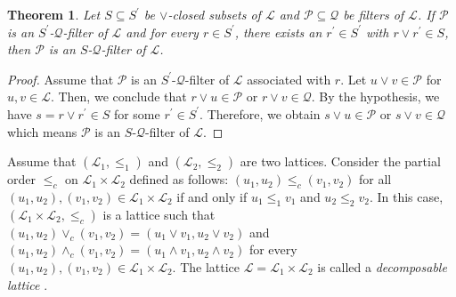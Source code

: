 \documentclass[preprint,review,10pt]{amsart}
\newtheorem{theorem}{Theorem}[section]
\theoremstyle{definition}
\theoremstyle{remark}
\numberwithin{equation}{section}
\begin{document}
\begin{theorem}
Let $S \subseteq S^{\prime}$ be   $\vee$-closed subsets of $\mathcal{L}$ and $\mathcal{P} \subseteq \mathcal{Q}$ be filters of $\mathcal{L}$. If  $\mathcal{P} $ is an  $S^{\prime}$-$\mathcal{Q}$-filter  of $\mathcal{L}$ and  for every $r \in S^{\prime}$, there exists an $r^{\prime} \in S^{\prime}$ with $r \vee r^{\prime} \in S$, then $\mathcal{P} $ is an $S$-$\mathcal{Q}$-filter of $\mathcal{L}$.
\end{theorem}
\begin{proof}
Assume that $\mathcal{P} $ is an  $S^{\prime}$-$\mathcal{Q}$-filter  of $\mathcal{L}$ associated with $r$. Let $u \vee v \in \mathcal{P} $ for $u,v \in  \mathcal{L}$. Then, we conclude that $r \vee u \in \mathcal{P} $ or $r \vee v \in \mathcal{Q} $. By the hypothesis, we have $s=r \vee r^{\prime} \in S$ for some $r^{\prime} \in S^{\prime}$. Therefore, we obtain $s \vee u \in \mathcal{P} $ or $s \vee v \in \mathcal{Q} $ which means $\mathcal{P} $ is an $S$-$\mathcal{Q}$-filter of $\mathcal{L}$.
\end{proof}
Assume that  $(\mathcal{L}_1,\le_1)$ and $(\mathcal{L}_2,\le_2)$ are two lattices. Consider the partial order $\le_c$ on $\mathcal{L}_1 \times  \mathcal{L}_2$ defined as follows: $(u_1,u_2) \le_c (v_1,v_2)$ for all $(u_1, u_2), (v_1, v_2) \in \mathcal{L}_1  \times \mathcal{L}_2$ if and only if $u_1 \le_1 v_1$ and $u_2 \le_2 v_2$. In this case, $(\mathcal{L}_1 \times  \mathcal{L}_2,\le_c)$ is a lattice such that $(u_1,u_2) \vee_c (v_1,v_2)=(u_1 \vee v_1,u_2 \vee v_2)$ and $(u_1,u_2) \wedge_c (v_1, v_2)=(u_1 \wedge v_1, u_2 \wedge v_2)$ for every $(u_1, u_2), (v_1, v_2) \in \mathcal{L}_1 \times   \mathcal{L}_2$. The lattice  $\mathcal{L}=\mathcal{L}_1  \times \mathcal{L}_2$ is called a {\it decomposable lattice} \cite{Atani2}.
\end{document}
